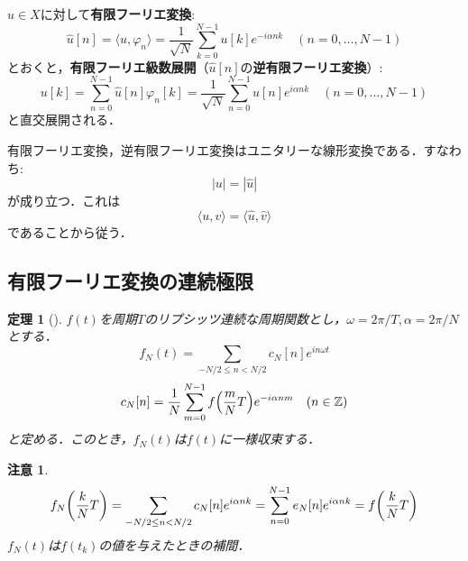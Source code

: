 \documentclass[dvipdfmx,a4j,10pt]{jsarticle}
\theoremstyle{mystyle1}
\newtheorem{theorem}[definition]{定理}
\theoremstyle{mystyle3}
\theoremstyle{mystyle4}
\newtheorem{note}{注意}[section]
\theoremstyle{mystyle2}
\newenvironment{thm}[1][]
{\begin{tcolorbox}[
    enhanced,
    boxrule=0pt,
    arc=0mm,
    frame hidden,
    borderline west={2pt}{-4pt}{red},
    breakable = true
    ]
    \begin{theorem}[#1]
}
{\end{theorem}\end{tcolorbox}}
\begin{document}
$u\in X$に対して\textbf{有限フーリエ変換}:
\begin{equation}\label{eq:1-12}
    \hat u[n]=\langle u,\varphi_n \rangle=\frac{1}{\sqrt{N}}\sum_{k=0}^{N-1}u[k]e^{-i\alpha nk}\quad(n=0,\ldots,N-1)
\end{equation}
とおくと，\textbf{有限フーリエ級数展開}（$\hat u[n]$の\textbf{逆有限フーリエ変換}）:
\begin{equation}\label{eq:1-13}
    u[k]=\sum_{n=0}^{N-1}\hat u[n]\varphi_n[k]=\frac{1}{\sqrt{N}}\sum_{n=0}^{N-1}\hat u[n]e^{i\alpha nk}\quad(n=0,\ldots,N-1)
\end{equation}
と直交展開される．

有限フーリエ変換，逆有限フーリエ変換はユニタリーな線形変換である．すなわち:
\begin{equation}\label{eq:1-14}
    |u|=|\hat u|
\end{equation}
が成り立つ．これは
\begin{equation}\label{eq:1-15}
    \langle u,v\rangle=\langle \hat u,\hat v\rangle
\end{equation}
であることから従う．

\subsection{有限フーリエ変換の連続極限}

\begin{thm}\label{thm:1-5}
    $f(t)$を周期$T$のリプシッツ連続な周期関数とし，$\omega=2\pi/T, \alpha=2\pi/N$とする．
    \[
        f_N(t)=\sum_{-N/2\leq n<N/2} c_N[n]e^{in\omega t}
    \]
    \[
        c_N[n]=\frac{1}{N}\sum_{m=0}^{N-1}f\mleft(\frac{m}{N}T\mright)e^{-i\alpha nm}\quad(n\in\mathbb{Z})
    \]
    と定める．このとき，$f_N(t)$は$f(t)$に一様収束する．
\end{thm}

\begin{note}\label{note:1-1}
    \[
        f_N\mleft(\frac{k}{N}T\mright)=\sum_{-N/2\leq n<N/2} c_N[n]e^{i\alpha nk}=\sum_{n=0}^{N-1}e_N[n]e^{i\alpha nk}=f\mleft(\frac{k}{N}T\mright)
    \]
    $f_N(t)$は$f(t_k)$の値を与えたときの補間．
\end{note}
\end{document}
